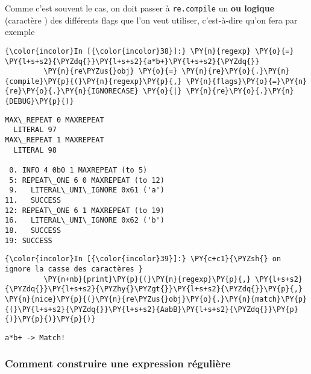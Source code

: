     Comme c'est souvent le cas, on doit passer à \texttt{re.compile} un
\textbf{ou logique} (caractère \texttt{\textbar{}}) des différents flags
que l'on veut utiliser, c'est-à-dire qu'on fera par exemple

    \begin{Verbatim}[commandchars=\\\{\},frame=single,framerule=0.3mm,rulecolor=\color{cellframecolor}]
{\color{incolor}In [{\color{incolor}38}]:} \PY{n}{regexp} \PY{o}{=} \PY{l+s+s2}{\PYZdq{}}\PY{l+s+s2}{a*b+}\PY{l+s+s2}{\PYZdq{}}
         \PY{n}{re\PYZus{}obj} \PY{o}{=} \PY{n}{re}\PY{o}{.}\PY{n}{compile}\PY{p}{(}\PY{n}{regexp}\PY{p}{,} \PY{n}{flags}\PY{o}{=}\PY{n}{re}\PY{o}{.}\PY{n}{IGNORECASE} \PY{o}{|} \PY{n}{re}\PY{o}{.}\PY{n}{DEBUG}\PY{p}{)}
\end{Verbatim}


    \begin{Verbatim}[commandchars=\\\{\},frame=single,framerule=0.3mm,rulecolor=\color{cellframecolor}]
MAX\_REPEAT 0 MAXREPEAT
  LITERAL 97
MAX\_REPEAT 1 MAXREPEAT
  LITERAL 98

 0. INFO 4 0b0 1 MAXREPEAT (to 5)
 5: REPEAT\_ONE 6 0 MAXREPEAT (to 12)
 9.   LITERAL\_UNI\_IGNORE 0x61 ('a')
11.   SUCCESS
12: REPEAT\_ONE 6 1 MAXREPEAT (to 19)
16.   LITERAL\_UNI\_IGNORE 0x62 ('b')
18.   SUCCESS
19: SUCCESS
\end{Verbatim}

    \begin{Verbatim}[commandchars=\\\{\},frame=single,framerule=0.3mm,rulecolor=\color{cellframecolor}]
{\color{incolor}In [{\color{incolor}39}]:} \PY{c+c1}{\PYZsh{} on ignore la casse des caractères }
         \PY{n+nb}{print}\PY{p}{(}\PY{n}{regexp}\PY{p}{,} \PY{l+s+s2}{\PYZdq{}}\PY{l+s+s2}{\PYZhy{}\PYZgt{}}\PY{l+s+s2}{\PYZdq{}}\PY{p}{,} \PY{n}{nice}\PY{p}{(}\PY{n}{re\PYZus{}obj}\PY{o}{.}\PY{n}{match}\PY{p}{(}\PY{l+s+s2}{\PYZdq{}}\PY{l+s+s2}{AabB}\PY{l+s+s2}{\PYZdq{}}\PY{p}{)}\PY{p}{)}\PY{p}{)}
\end{Verbatim}


    \begin{Verbatim}[commandchars=\\\{\},frame=single,framerule=0.3mm,rulecolor=\color{cellframecolor}]
a*b+ -> Match!
\end{Verbatim}

    \hypertarget{comment-construire-une-expression-ruxe9guliuxe8re}{%
\subsubsection{Comment construire une expression
régulière}\label{comment-construire-une-expression-ruxe9guliuxe8re}}

